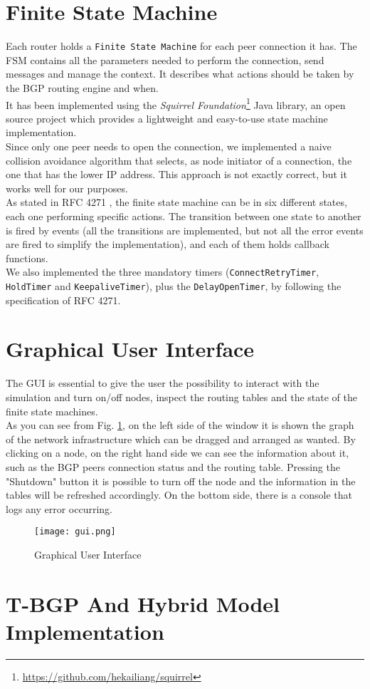 \section{Finite State Machine}\label{fsm}
Each router holds a \texttt{Finite State Machine} for each peer connection it has. The FSM contains all the parameters needed to perform the connection, send messages and manage the context. It describes what actions should be taken by the BGP routing engine and when.\\
It has been implemented using the \textit{Squirrel Foundation}\footnote{\url{https://github.com/hekailiang/squirrel}} Java library, an open source project which provides a lightweight and easy-to-use state machine implementation.\\
Since only one peer needs to open the connection, we implemented a naive collision avoidance algorithm that selects, as node initiator of a connection, the one that has the lower IP address. This approach is not exactly correct, but it works well for our purposes.\\
As stated in RFC 4271 \cite{rfc4271}, the finite state machine can be in six different states, each one performing specific actions. The transition between one state to another is fired by events (all the transitions are implemented, but not all the error events are fired to simplify the implementation), and each of them holds callback functions.\\
We also implemented the three mandatory timers (\texttt{ConnectRetryTimer}, \texttt{HoldTimer} and \texttt{KeepaliveTimer}), plus the \texttt{DelayOpenTimer}, by following the specification of RFC 4271.

\section{Graphical User Interface}
The GUI is essential to give the user the possibility to interact with the simulation and turn on/off nodes, inspect the routing tables and the state of the finite state machines.\\
As you can see from Fig. \ref{fig:gui}, on the left side of the window it is shown the graph of the network infrastructure which can be dragged and arranged as wanted. By clicking on a node, on the right hand side we can see the information about it, such as the BGP peers connection status and the routing table. Pressing the "Shutdown" button it is possible to turn off the node and the information in the tables will be refreshed accordingly. 
On the bottom side, there is a console that logs any error occurring.
\begin{figure}[h]
    \centering
    \texttt{[image: gui.png]}
    \caption{Graphical User Interface}
    \label{fig:gui}
\end{figure}


\section{T-BGP And Hybrid Model Implementation}\label{BGPTrust}
